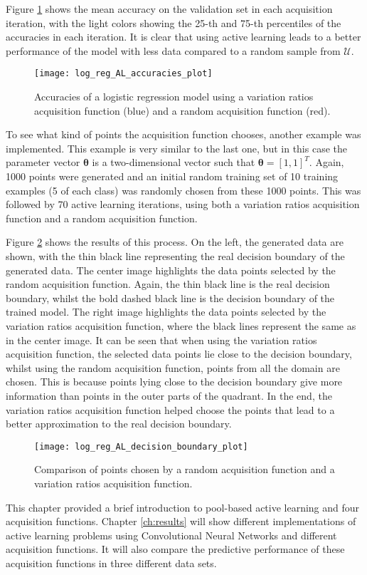 Figure \ref{fig:log_reg_AL_accuracies_plot} shows the mean accuracy on the validation set in each acquisition iteration, with the light colors showing the 25-th and 75-th percentiles of the accuracies in each iteration. It is clear that using active learning leads to a better performance of the model with less data compared to a random sample from $\mathcal{U}$.

\begin{figure}[H]
    \centering
    \texttt{[image: log\_reg\_AL\_accuracies\_plot]}
    \caption{Accuracies of a logistic regression model using a variation ratios acquisition function (blue) and a random acquisition function (red).}
    \label{fig:log_reg_AL_accuracies_plot}
\end{figure}

To see what kind of points the acquisition function chooses, another example was implemented. This example is very similar to the last one, but in this case the parameter vector $\boldsymbol{\theta}$ is a two-dimensional vector such that $\boldsymbol{\theta} = \left[ 1, 1 \right]^T$. Again, 1000 points were generated and an initial random training set of 10 training examples (5 of each class) was randomly chosen from these 1000 points. This was followed by 70 active learning iterations, using both a variation ratios acquisition function and a random acquisition function.

Figure \ref{fig:log_reg_AL_decision_boundary_plot} shows the results of this process. On the left, the generated data are shown, with the thin black line representing the real decision boundary of the generated data. The center image highlights the data points selected by the random acquisition function. Again, the thin black line is the real decision boundary, whilst the bold dashed black line is the decision boundary of the trained model. The right image highlights the data points selected by the variation ratios acquisition function, where the black lines represent the same as in the center image. It can be seen that when using the variation ratios acquisition function, the selected data points lie close to the decision boundary, whilst using the random acquisition function, points from all the domain are chosen. This is because points lying close to the decision boundary give more information than points in the outer parts of the quadrant. In the end, the variation ratios acquisition function helped choose the points that lead to a better approximation to the real decision boundary.

\begin{figure}[H]
    \centering
    \texttt{[image: log\_reg\_AL\_decision\_boundary\_plot]}
    \caption{Comparison of points chosen by a random acquisition function and a variation ratios acquisition function.}
    \label{fig:log_reg_AL_decision_boundary_plot}
\end{figure}

This chapter provided a brief introduction to pool-based active learning and four acquisition functions. Chapter \ref{ch:results} will show different implementations of active learning problems using Convolutional Neural Networks and different acquisition functions. It will also compare the predictive performance of these acquisition functions in three different data sets.
